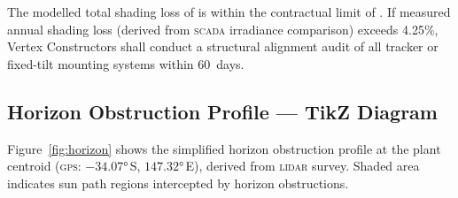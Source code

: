 The modelled total shading loss of  is within the contractual limit of
. If measured annual shading loss (derived from \textsc{scada} irradiance
comparison) exceeds 4.25\%, Vertex Constructors shall conduct a structural alignment audit of
all tracker or fixed-tilt mounting systems within 60~days.

\subsection{Horizon Obstruction Profile — TikZ Diagram}

Figure~\ref{fig:horizon} shows the simplified horizon obstruction profile at the plant
centroid (\textsc{gps}: $-34.07°$\,S, $147.32°$\,E), derived from \textsc{lidar} survey.
Shaded area indicates sun path regions intercepted by horizon obstructions.

